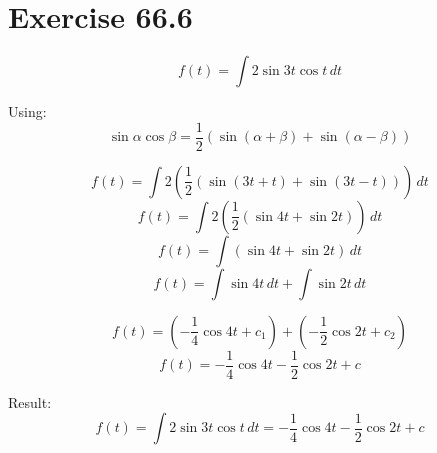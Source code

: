 \documentclass[a4paper, 10pt]{scrartcl}
\begin{document}
\section{Exercise 66.6}

\[f(t) = \int{2\sin{3t}\cos{t}\,dt}\]

Using:
\[\sin{\alpha}\cos{\beta} = \frac{1}{2}(\sin{(\alpha + \beta)} + \sin{(\alpha - \beta)})\]

\[f(t) = \int{2\left(\frac{1}{2}(\sin{(3t + t)} + \sin{(3t - t)})\right)\,dt}\]
\[f(t) = \int{2\left(\frac{1}{2}(\sin{4t} + \sin{2t})\right)\,dt}\]
\[f(t) = \int{(\sin{4t} + \sin{2t})\,dt}\]
\[f(t) = \int{\sin{4t}\,dt} + \int{\sin{2t}\,dt}\]

\[f(t) = (-\frac{1}{4}\cos{4t} + c_1) + (-\frac{1}{2}\cos{2t} + c_2)\]
\[f(t) = -\frac{1}{4}\cos{4t} - \frac{1}{2}\cos{2t} + c\]

Result:
\[f(t) = \int{2\sin{3t}\cos{t}\,dt} =
         -\frac{1}{4}\cos{4t} - \frac{1}{2}\cos{2t} + c\]
\end{document}
